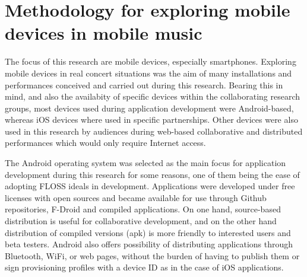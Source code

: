 
\section{Methodology for exploring mobile devices in mobile music}

The focus of this research are mobile devices, especially smartphones.
Exploring mobile devices in real concert situations was the aim of many installations and performances conceived and carried out during this research.
Bearing this in mind, and also the availabity of specific devices within the collaborating research groups, most devices used during application development were Android-based, whereas iOS devices where used in specific partnerships.
Other devices were also used in this research by audiences during web-based collaborative and distributed performances which would only require Internet access. 



The Android operating system was selected as the main focus for application development during this research for some reasons, one of them being the ease of adopting FLOSS ideals in development.
Applications were developed under free licenses with open sources and became available for use through Github repositories, F-Droid and compiled applications. On one hand, source-based distribution is useful for collaborative development, and on the other hand distribution of compiled versions (apk) is more friendly to interested users and beta testers.
Android also offers possibility of distributing applications through Bluetooth, WiFi, or web pages, without the burden of having to publish them or sign provisioning profiles with a device ID as in the case of iOS applications.

